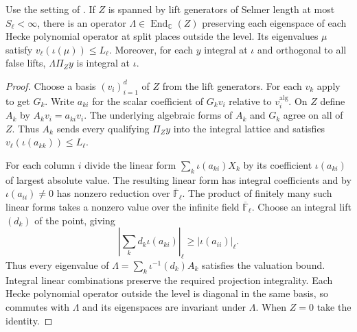 \begin{lemma}
\label{lem:c-common-denominator}
\emitthmsource
Use the setting of .
If $Z$ is spanned by lift generators of Selmer length at most $S_\ell<\infty$, there is an operator $\Lambda\in\operatorname{End}_{\mathbb C}(Z)$ preserving each eigenspace of each Hecke polynomial operator at split places outside the level. Its eigenvalues $\mu$ satisfy $v_\ell(\iota(\mu))\le L_\ell$.
Moreover, for each $y$ integral at $\iota$ and orthogonal to all false lifts, $\Lambda\Pi_Zy$ is integral at $\iota$.
\end{lemma}
\begin{proof}
Choose a basis $(v_i)_{i=1}^d$ of $Z$ from the lift generators.
For each $v_k$ apply  to get $G_k$. Write $a_{ki}$ for the scalar coefficient of $G_kv_i$ relative to $v_i^{\mathrm{alg}}$.
On $Z$ define $A_k$ by $A_kv_i=a_{ki}v_i$. The underlying algebraic forms of $A_k$ and $G_k$ agree on all of $Z$.
Thus $A_k$ sends every qualifying $\Pi_Zy$ into the integral lattice and satisfies $v_\ell(\iota(a_{kk}))\le L_\ell$.

For each column $i$ divide the linear form $\sum_k\iota(a_{ki})X_k$ by its coefficient $\iota(a_{ki})$ of largest absolute value.
The resulting linear form has integral coefficients and by $\iota(a_{ii})\ne0$ has nonzero reduction over $\overline{\mathbb F}_\ell$.
The product of finitely many such linear forms takes a nonzero value over the infinite field $\overline{\mathbb F}_\ell$. Choose an integral lift $(d_k)$ of the point, giving
\[
 \left|\sum_k d_k\iota(a_{ki})\right|_\ell\ge |\iota(a_{ii})|_\ell .
\]
Thus every eigenvalue of $\Lambda=\sum_k\iota^{-1}(d_k)A_k$ satisfies the valuation bound. Integral linear combinations preserve the required projection integrality.
Each Hecke polynomial operator outside the level is diagonal in the same basis, so commutes with $\Lambda$ and its eigenspaces are invariant under $\Lambda$. When $Z=0$ take the identity.
\end{proof}

